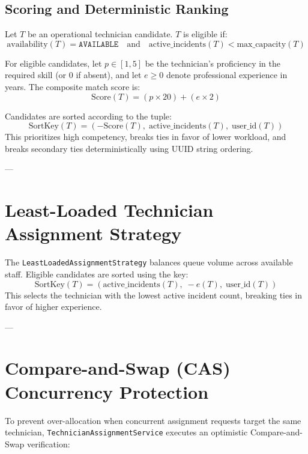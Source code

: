 \documentclass[11pt,a4paper,oneside]{report}
\begin{document}
\subsection{Scoring and Deterministic Ranking}
Let $T$ be an operational technician candidate. $T$ is eligible if:
\begin{equation}
\text{availability}(T) = \texttt{AVAILABLE} \quad \text{and} \quad \text{active\_incidents}(T) < \text{max\_capacity}(T)
\end{equation}

For eligible candidates, let $p \in [1, 5]$ be the technician's proficiency in the required skill (or $0$ if absent), and let $e \ge 0$ denote professional experience in years. The composite match score is:
\begin{equation}
\text{Score}(T) = (p \times 20) + (e \times 2)
\end{equation}

Candidates are sorted according to the tuple:
\begin{equation}
\text{SortKey}(T) = \left(-\text{Score}(T), \; \text{active\_incidents}(T), \; \text{user\_id}(T)\right)
\end{equation}
This prioritizes high competency, breaks ties in favor of lower workload, and breaks secondary ties deterministically using UUID string ordering.

---

\section{Least-Loaded Technician Assignment Strategy}
\label{sec:algo_least_loaded}
The \texttt{LeastLoadedAssignmentStrategy} balances queue volume across available staff. Eligible candidates are sorted using the key:
\begin{equation}
\text{SortKey}(T) = \left(\text{active\_incidents}(T), \; -e(T), \; \text{user\_id}(T)\right)
\end{equation}
This selects the technician with the lowest active incident count, breaking ties in favor of higher experience.

---

\section{Compare-and-Swap (CAS) Concurrency Protection}
\label{sec:algo_cas}
To prevent over-allocation when concurrent assignment requests target the same technician, \texttt{TechnicianAssignmentService} executes an optimistic Compare-and-Swap verification:
\end{document}
